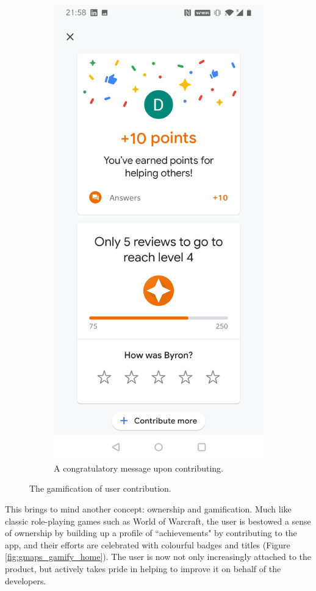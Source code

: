 \begin{figure}[htb!]
\begin{center}
\begin{subfigure}{.3\textwidth}
            \includegraphics[width=0.8\linewidth]{images/gmaps_gamified_complete.jpg}
            \caption{A congratulatory message upon contributing.}
            \label{fig:gmaps_gamify_congrat}
        \end{subfigure}%
        \caption{The gamification of user contribution.}
        \label{fig:gmaps_gamification}
    \end{center}
\end{figure}

This brings to mind another concept: ownership and gamification. Much like classic role-playing games such as World of Warcraft, the user is bestowed a sense of ownership by building up a profile of ``achievements" by contributing to the app, and their efforts are celebrated with colourful badges and titles (Figure \ref{fig:gmaps_gamify_home}). The user is now not only increasingly attached to the product, but actively takes pride in helping to improve it on behalf of the developers.

